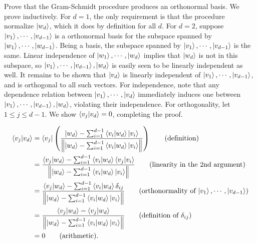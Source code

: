  Prove that the Gram-Schmidt procedure produces an orthonormal basis.
\Soln
We prove inductively.  For $d = 1$, the only requirement is that the procedure normalize $\ket{w_d}$, which it does by definition for all $d$.   For $d = 2$, suppose $\ket{v_1}, \cdots,\ket{v_{d-1}}$ is a orthonormal basis for the subspace spanned by  $\ket{w_1},\cdots,\ket{w_{d-1}}$.  Being a basis, the subspace spanned by $\ket{v_1},\cdots,\ket{v_{d-1}}$ is the same.  Linear independence of $\ket{w_1},\cdots,\ket{w_d}$ implies that $\ket{w_d}$ is not in this subspace, so $\ket{v_1},\cdots,\ket{v_{d-1}},\ket{w_d}$ is easily seen to be linearly independent as well.  It remains to be shown that $\ket{v_d}$ is linearly independent of $\ket{v_1},\cdots,\ket{v_{d-1}}$, and is orthogonal to all such vectors.  For independence, note that any dependence relation between $\ket{v_1},\cdots,\ket{v_d}$ immediately induces one between $\ket{v_1},\cdots,\ket{v_{d-1}},\ket{w_d}$, violating their independence.  For orthogonality, let $1\leq j\leq d-1$.  We show $\braket{v_j|v_d} = 0$, completing the proof.

\begin{comment}
\begin{align*}
	\ket{v_2} &= \frac{\ket{w_2} - \braket{v_1 | w_2}\ket{v_1}}{\norm{\ket{w_2} - \braket{v_1 | w_2}\ket{v_1}}}\\
	\braket{v_1 | v_2} &= \bra{v_1} \left(\frac{\ket{w_2} - \braket{v_1 | w_2}\ket{v_1}}{\norm{\ket{w_2} - \braket{v_1 | w_2}\ket{v_1}}}\right)\\
		&= \frac{\braket{v_1 | w_2} - \braket{v_1 | w_2}\braket{v_1 | v_1}}{\norm{\ket{w_2} - \braket{v_1 | w_2}\ket{v_1}}}\\
		&= 0.
\end{align*}
\end{comment}


\begin{align*}
	\braket{v_j | v_d} &= \bra{v_j} \left(\frac{\ket{w_d} - \sum_{i=1}^{d-1}\braket{v_i | w_d}\ket{v_i}}{\norm{\ket{w_d} - \sum_{i=1}^{d-1}\braket{v_i | w_d}\ket{v_i}}}\right) \tag{definition}\\
	&= \frac{\braket{v_j | w_d} - \sum_{i=1}^{d-1}\braket{v_i | w_d}\braket{v_j | v_i}}{\norm{\ket{w_d} - \sum_{i=1}^{d-1}\braket{v_i | w_d}\ket{v_i}}} \tag{linearity in the 2nd argument}\\
	&= \frac{\braket{v_j | w_d} - \sum_{i=1}^{d-1}\braket{v_i | w_d}\delta_{ij}}{\norm{\ket{w_d} - \sum_{i=1}^{d-1}\braket{v_i | w_d}\ket{v_i}}} \tag{orthonormality of $\ket{v_1},\cdots,\ket{v_{d-1}}$}\\
	&= \frac{\braket{v_j | w_d} - \braket{v_j | w_d}}{\norm{\ket{w_d} - \sum_{i=1}^{d-1}\braket{v_i | w_d}\ket{v_i}}} \tag{definition of $\delta_{ij}$}\\
	&= 0 \tag{arithmetic}.
\end{align*}


